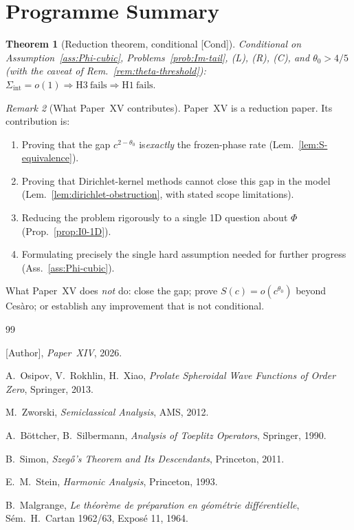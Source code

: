 \documentclass[12pt,a4paper]{amsart}
\newtheorem{theorem}{Theorem}[section]
\theoremstyle{definition}
\theoremstyle{remark}
\newtheorem{remark}[theorem]{Remark}
\newcommand{\Cond}{\textup{[Cond]}}
\begin{document}
\section{Programme Summary}
\label{sec:summary}

\begin{theorem}[Reduction theorem,
  conditional \Cond]
\label{thm:reduction}
Conditional on
Assumption~\ref{ass:Phi-cubic},
Problems~\ref{prob:Im-tail},
(L), (R), (C),
and $\theta_0>4/5$
(with the caveat of
Rem.~\ref{rem:theta-threshold}):
$\Sigma_{\mathrm{int}}=o(1)
\Rightarrow
\mathrm{H3\ fails}
\Rightarrow
\mathrm{H1\ fails.}$
\end{theorem}

\begin{remark}[What Paper~XV
  contributes]
\label{rem:contribution}
Paper~XV is a reduction paper.
Its contribution is:
\begin{enumerate}[\rm(1)]
\item Proving that the gap
  $c^{2-\theta_0}$ is\emph{exactly}
  the frozen-phase rate
  (Lem.~\ref{lem:S-equivalence}).
\item Proving that Dirichlet-kernel
  methods cannot close this gap
  in the model
  (Lem.~\ref{lem:dirichlet-obstruction},
  with stated scope limitations).
\item Reducing the problem
  rigorously to a single
  1D question about $\Phi$
  (Prop.~\ref{prop:I0-1D}).
\item Formulating precisely
  the single hard assumption
  needed for further progress
  (Ass.~\ref{ass:Phi-cubic}).
\end{enumerate}
What Paper~XV does \emph{not} do:
close the gap; prove $S(c)=o(c^{\theta_0})$
beyond Ces\`aro;
or establish any improvement
that is not conditional.
\end{remark}

\begin{thebibliography}{99}

[Author], \textit{Paper~XIV}, 2026.

A.~Osipov, V.~Rokhlin, H.~Xiao,
\textit{Prolate Spheroidal Wave
Functions of Order Zero},
Springer, 2013.

M.~Zworski,
\textit{Semiclassical Analysis},
AMS, 2012.

A.~B\"ottcher, B.~Silbermann,
\textit{Analysis of Toeplitz Operators},
Springer, 1990.

B.~Simon,
\textit{Szeg\H{o}'s Theorem and
Its Descendants}, Princeton, 2011.

E.~M.~Stein,
\textit{Harmonic Analysis},
Princeton, 1993.

B.~Malgrange,
\textit{Le th\'eor\`eme de
pr\'eparation en g\'eom\'etrie
diff\'erentielle},
S\'em.\ H.~Cartan 1962/63,
Expos\'e 11, 1964.

\end{thebibliography}
\end{document}
